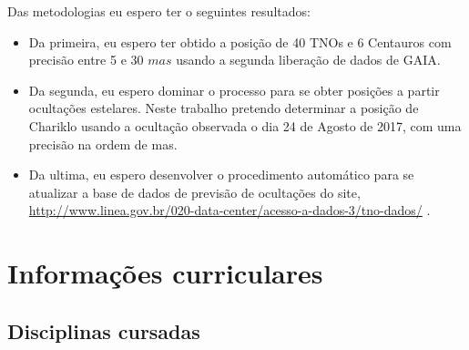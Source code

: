 \documentclass[a4paper, 11pt]{article}
\begin{document}
Das metodologias eu espero ter o seguintes resultados:
\begin{itemize}
  \item Da primeira, eu espero ter obtido a posição de 40 TNOs e 6 Centauros com precisão entre 5 e 30 $mas$ usando a segunda liberação de dados de GAIA.
  \item Da segunda, eu espero dominar o processo para se obter posições a partir ocultações estelares. Neste trabalho pretendo determinar a posição de Chariklo usando a ocultação observada o dia 24 de Agosto de 2017, com uma precisão na ordem de mas. 
  \item Da ultima, eu espero desenvolver o procedimento automático para se atualizar a base de dados de previsão de ocultações do site,  \url{http://www.linea.gov.br/020-data-center/acesso-a-dados-3/tno-dados/} .    
\end{itemize}

\section{Informa\c{c}\~oes curriculares}

\subsection{Disciplinas cursadas}

\begin{center}
\end{center}
\end{document}
